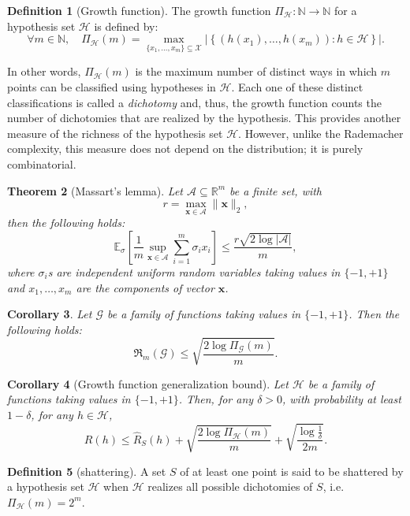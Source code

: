 \documentclass[12pt]{article}
\theoremstyle{definition} %
\newtheorem{definition}{Definition}[section]
\theoremstyle{plain} %
\newtheorem{theorem}[definition]{Theorem}
\newtheorem{corollary}[definition]{Corollary}
\theoremstyle{remark} %
\begin{document}
\begin{CJK}{UTF8}{gbsn}
\begin{definition}[Growth function]
The growth function $\Pi_{\mathcal{H}} : \mathbb{N} \to \mathbb{N}$ for a hypothesis set $\mathcal{H}$ is defined by:
\[
\forall m \in \mathbb{N}, \quad 
\Pi_{\mathcal{H}}(m) = 
\max_{\{x_1,\ldots,x_m\} \subseteq \mathcal{X}}
\left| \left\{ (h(x_1), \ldots, h(x_m)) : h \in \mathcal{H} \right\} \right|.
\tag{3.19}
\]

In other words, $\Pi_{\mathcal{H}}(m)$ is the maximum number of distinct ways in which $m$ points can be classified using hypotheses in $\mathcal{H}$. 
Each one of these distinct classifications is called a \emph{dichotomy} and, thus, the growth function counts the number of dichotomies that are realized by the hypothesis. 
This provides another measure of the richness of the hypothesis set $\mathcal{H}$. 
However, unlike the Rademacher complexity, this measure does not depend on the distribution; it is purely combinatorial.
\end{definition}

\begin{theorem}[Massart's lemma]
Let $\mathcal{A} \subseteq \mathbb{R}^m$ be a finite set, with 
\[
r = \max_{\mathbf{x} \in \mathcal{A}} \|\mathbf{x}\|_2,
\] 
then the following holds:
\[
\mathbb{E}_{\sigma} \left[ \frac{1}{m} \sup_{\mathbf{x} \in \mathcal{A}} \sum_{i=1}^m \sigma_i x_i \right] 
\leq \frac{r \sqrt{2 \log |\mathcal{A}|}}{m},
\tag{3.20}
\]
where $\sigma_i$s are independent uniform random variables taking values in $\{-1,+1\}$ and $x_1, \ldots, x_m$ are the components of vector $\mathbf{x}$.
\end{theorem}

\begin{corollary}
Let $\mathcal{G}$ be a family of functions taking values in $\{-1,+1\}$. 
Then the following holds:
\[
\mathfrak{R}_m(\mathcal{G}) \leq \sqrt{\frac{2 \log \Pi_{\mathcal{G}}(m)}{m}}.
\tag{3.21}
\]
\end{corollary}

\begin{corollary}[Growth function generalization bound]
Let $\mathcal{H}$ be a family of functions taking values in $\{-1,+1\}$. 
Then, for any $\delta > 0$, with probability at least $1-\delta$, 
for any $h \in \mathcal{H}$,
\[
R(h) \leq \hat{R}_S(h) 
+ \sqrt{\frac{2 \log \Pi_{\mathcal{H}}(m)}{m}} 
+ \sqrt{\frac{\log \tfrac{1}{\delta}}{2m}}.
\tag{3.22}
\]
\end{corollary}

\begin{definition}[shattering]
A set $S$ of at least one point is said to be shattered by a hypothesis set $\mathcal{H}$ when $\mathcal{H}$ realizes all possible dichotomies of $S$, i.e. $\Pi_{\mathcal{H}}(m)=2^m$.    
\end{definition}


\end{CJK}
\end{document}
